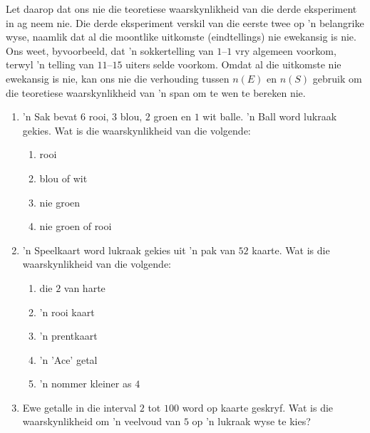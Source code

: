 Let daarop dat ons nie die teoretiese waarskynlikheid van die derde eksperiment in ag neem nie. Die derde eksperiment verskil van die eerste twee op 'n belangrike wyse, naamlik dat al die moontlike uitkomste (eindtellings) nie ewekansig is nie. Ons weet, byvoorbeeld, dat 'n sokkertelling van $1$--$1$ vry algemeen voorkom, terwyl 'n telling van $11$--$15$ uiters selde voorkom. Omdat al die uitkomste nie ewekansig is nie, kan ons nie die verhouding tussen \(n(E)\) en \(n(S)\) gebruik om die teoretiese waarskynlikheid van 'n span om te wen te bereken nie.

\begin{exercises}{}
{
  \begin{enumerate}[itemsep=5pt, label=\textbf{\arabic*}.]
  \item 'n Sak bevat $6$ rooi, $3$ blou, $2$ groen en $1$ wit
    balle. 'n Ball word lukraak gekies. Wat is die waarskynlikheid van die volgende:
    \begin{enumerate}
    \item rooi
    \item blou of wit
    \item nie groen
    \item nie groen of rooi
    \end{enumerate}
  \item 'n Speelkaart word lukraak gekies uit 'n pak van $52$ kaarte. Wat is die waarskynlikheid van die volgende:
    \begin{enumerate}

    \item die $2$ van harte
    \item 'n rooi kaart
    \item 'n prentkaart
    \item 'n 'Ace' getal
    \item 'n nommer kleiner as $4$
    \end{enumerate}

  \item Ewe getalle in die interval $2$ tot $100$ word op kaarte geskryf. Wat is
    die waarskynlikheid om 'n veelvoud van $5$ op 'n lukraak wyse te kies?
  \end{enumerate}

}
\end{exercises}

